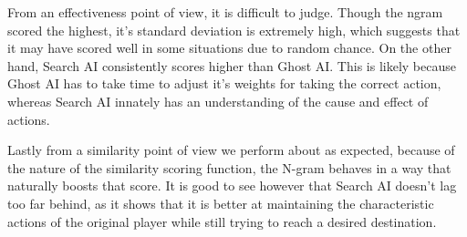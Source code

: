 From an effectiveness point of view, it is difficult to judge. Though the ngram scored the highest, it's standard deviation is extremely high, which suggests that it may have scored well in some situations due to random chance. On the other hand, Search AI consistently scores higher than Ghost AI. This is likely because Ghost AI has to take time to adjust it's weights for taking the correct action, whereas Search AI innately has an understanding of the cause and effect of actions.

Lastly from a similarity point of view we perform about as expected, because of the nature of the similarity scoring function, the N-gram behaves in a way that naturally boosts that score. It is good to see however that Search AI doesn't lag too far behind, as it shows that it is better at maintaining the characteristic actions of the original player while still trying to reach a desired destination.